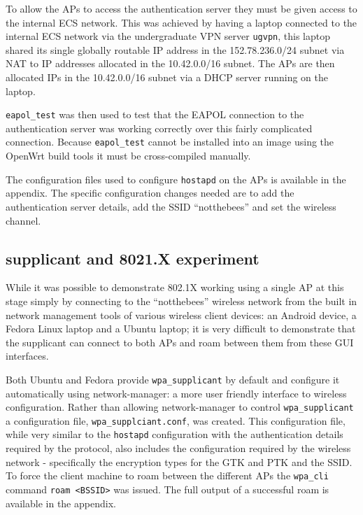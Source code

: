 \documentclass[pdftex, 12pt, a4paper]{article}
\begin{document}
To allow the APs to access the authentication server they must be given access to the internal ECS network.  This was achieved by having a laptop connected to the internal ECS network via the undergraduate VPN server \verb`ugvpn`, this laptop shared its single globally routable IP address in the 152.78.236.0/24 subnet via NAT to IP addresses allocated in the 10.42.0.0/16 subnet.  The APs are then allocated IPs in the 10.42.0.0/16 subnet via a DHCP server running on the laptop.


\verb`eapol_test` was then used to test that the EAPOL connection to the authentication server was working correctly over this fairly complicated connection.  Because \verb`eapol_test` cannot be installed into an image using the OpenWrt build tools it must be cross-compiled manually.

The configuration files used to configure \verb`hostapd` on the APs is available in the appendix.  The specific configuration changes needed are to add the authentication server details, add the SSID ``notthebees'' and set the wireless channel.

\subsection{supplicant and 8021.X experiment}
While it was possible to demonstrate 802.1X working using a single AP at this stage simply by connecting to the ``notthebees'' wireless network from the built in network management tools of various wireless client devices: an Android device, a Fedora Linux laptop and a Ubuntu laptop; it is very difficult to demonstrate that the supplicant can connect to both APs and roam between them from these GUI interfaces.

Both Ubuntu and Fedora provide \verb`wpa_supplicant` by default and configure it automatically using network-manager: a more user friendly interface to wireless configuration.  Rather than allowing network-manager to control \verb`wpa_supplicant` a configuration file, \verb`wpa_supplciant.conf`, was created. This configuration file, while very similar to the \verb`hostapd` configuration with the authentication details required by the protocol, also includes the configuration required by the wireless network - specifically the encryption types for the GTK and PTK and the SSID.  To force the client machine to roam between the different APs the \verb`wpa_cli` command \verb`roam <BSSID>` was issued.  The full output of a successful roam is available in the appendix.
\end{document}
